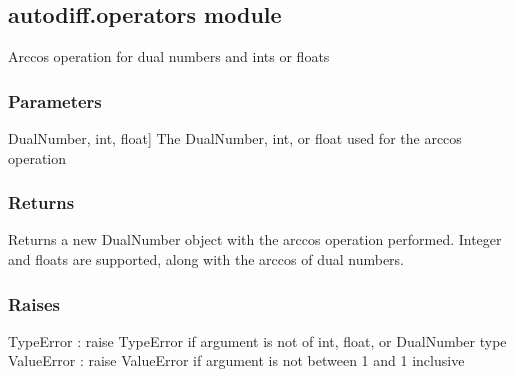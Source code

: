 \documentclass[letterpaper,10pt,english]{sphinxmanual}
\begin{document}
\subsection{autodiff.operators module}
\label{\detokenize{autodiff:module-autodiff.operators}}\label{\detokenize{autodiff:autodiff-operators-module}}

\begin{fulllineitems}
\label{\detokenize{autodiff:autodiff.operators.arccos}}
\pysigstartsignatures
{}
\pysigstopsignatures
\sphinxAtStartPar
Arccos operation for dual numbers and ints or floats


\subsubsection{Parameters}
\label{\detokenize{autodiff:id7}}\begin{description}
\sphinxlineitem{x}{[}DualNumber, int, float{]}
\sphinxAtStartPar
The DualNumber, int, or float used for the arccos operation

\end{description}


\subsubsection{Returns}
\label{\detokenize{autodiff:id8}}\begin{description}
\sphinxAtStartPar
Returns a new DualNumber object with the arccos operation performed. Integer and
floats are supported, along with the arccos of dual numbers.

\end{description}


\subsubsection{Raises}
\label{\detokenize{autodiff:raises}}
\sphinxAtStartPar
TypeError : raise TypeError if argument is not of int, float, or DualNumber type
ValueError : raise ValueError if argument is not between \sphinxhyphen{}1 and 1 inclusive

\end{fulllineitems}
\end{document}
